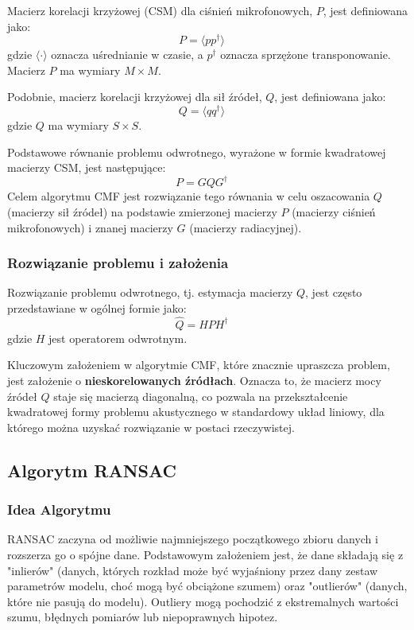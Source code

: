 \documentclass[12pt]{article}
\begin{document}
Macierz korelacji krzyżowej (CSM) dla ciśnień mikrofonowych, $P$, jest definiowana jako:
\begin{equation}
P = \langle pp^\dagger \rangle \quad \text{}
\end{equation}
gdzie $\langle \cdot \rangle$ oznacza uśrednianie w czasie, a $p^\dagger$ oznacza sprzężone transponowanie. Macierz $P$ ma wymiary $M \times M$.

Podobnie, macierz korelacji krzyżowej dla sił źródeł, $Q$, jest definiowana jako:
\begin{equation}
Q = \langle qq^\dagger \rangle \quad \text{}
\end{equation}
gdzie $Q$ ma wymiary $S \times S$.

Podstawowe równanie problemu odwrotnego, wyrażone w formie kwadratowej macierzy CSM, jest następujące:
\begin{equation}
P = G Q G^\dagger \quad \text{}
\end{equation}
Celem algorytmu CMF jest rozwiązanie tego równania w celu oszacowania $Q$ (macierzy sił źródeł) na podstawie zmierzonej macierzy $P$ (macierzy ciśnień mikrofonowych) i znanej macierzy $G$ (macierzy radiacyjnej).

\subsubsection{Rozwiązanie problemu i założenia}
Rozwiązanie problemu odwrotnego, tj. estymacja macierzy $Q$, jest często przedstawiane w ogólnej formie jako:
\begin{equation}
\hat{Q} = H P H^\dagger \quad \text{}
\end{equation}
gdzie $H$ jest operatorem odwrotnym.

Kluczowym założeniem w algorytmie CMF, które znacznie upraszcza problem, jest założenie o \textbf{nieskorelowanych źródłach}. Oznacza to, że macierz mocy źródeł $Q$ staje się macierzą diagonalną, co pozwala na przekształcenie kwadratowej formy problemu akustycznego w standardowy układ liniowy, dla którego można uzyskać rozwiązanie w postaci rzeczywistej.

\subsection{Algorytm RANSAC}
\subsubsection{Idea Algorytmu}
RANSAC zaczyna od możliwie najmniejszego początkowego zbioru danych i rozszerza go o spójne dane. Podstawowym założeniem jest, że dane składają się z "inlierów" (danych, których rozkład może być wyjaśniony przez dany zestaw parametrów modelu, choć mogą być obciążone szumem) oraz "outlierów" (danych, które nie pasują do modelu). Outliery mogą pochodzić z ekstremalnych wartości szumu, błędnych pomiarów lub niepoprawnych hipotez.
\end{document}
